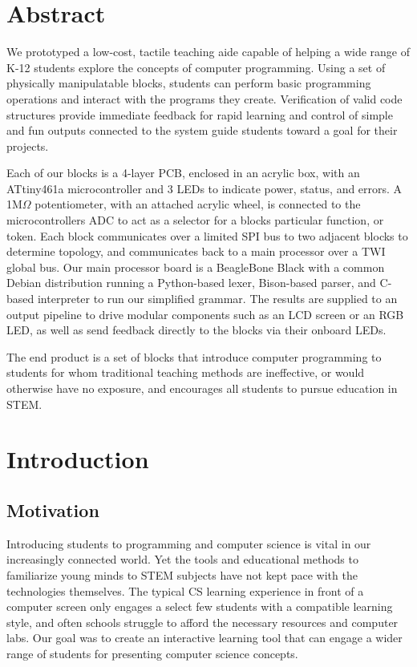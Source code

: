 \documentclass[12pt,a4paper]{article}
\begin{document}
\section{Abstract}
We prototyped a low-cost, tactile teaching aide capable of helping a wide range of K-12 students explore the concepts of computer programming. Using a set of physically manipulatable blocks, students can perform basic programming operations and interact with the programs they create. Verification of valid code structures provide immediate feedback for rapid learning and control of simple and fun outputs connected to the system guide students toward a goal for their projects. 

Each of our blocks is a 4-layer PCB, enclosed in an acrylic box, with an ATtiny461a microcontroller and 3 LEDs to indicate power, status, and errors. A 1M$\Omega$ potentiometer, with an attached acrylic wheel, is connected to the microcontroller\textquotesingle s ADC to act as a selector for a block\textquotesingle s particular function, or token. Each block communicates over a limited SPI bus to two adjacent blocks to determine topology, and communicates back to a main processor over a TWI global bus. Our main processor board is a BeagleBone Black with a common Debian distribution running a Python-based lexer, Bison-based parser, and C-based interpreter to run our simplified grammar. The results are supplied to an output pipeline to drive modular components such as an LCD screen or an RGB LED, as well as send feedback directly to the blocks via their onboard LEDs. 


The end product is a set of blocks that introduce computer programming to students for whom traditional teaching methods are ineffective, or would otherwise have no exposure, and encourages all students to pursue education in STEM.

\section{Introduction}
\subsection{Motivation}
Introducing students to programming and computer science is vital in our increasingly connected world. Yet the tools and educational methods to familiarize young minds to STEM subjects have not kept pace with the technologies themselves. The typical CS learning experience in front of a computer screen only engages a select few students with a compatible learning style, and often schools struggle to afford the necessary resources and computer labs. Our goal was to create an interactive learning tool that can engage a wider range of students for presenting computer science concepts.
\end{document}
